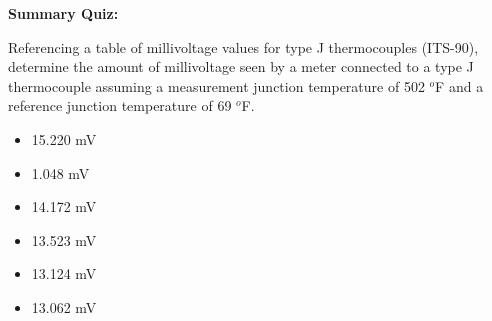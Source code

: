 \vfil \eject

\noindent
{\bf Summary Quiz:}

Referencing a table of millivoltage values for type J thermocouples (ITS-90), determine the amount of millivoltage seen by a meter connected to a type J thermocouple assuming a measurement junction temperature of 502 $^{o}$F and a reference junction temperature of 69 $^{o}$F.

\begin{itemize}
\item{} 15.220 mV
\vskip 5pt 
\item{} 1.048 mV
\vskip 5pt 
\item{} 14.172 mV
\vskip 5pt 
\item{} 13.523 mV
\vskip 5pt 
\item{} 13.124 mV
\vskip 5pt 
\item{} 13.062 mV
\end{itemize}





